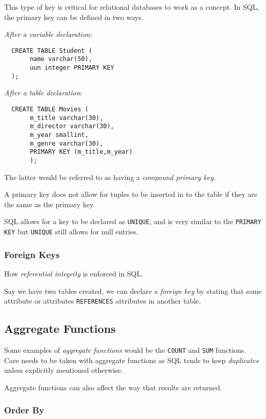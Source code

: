 \documentclass{article}
\begin{document}
This type of key is critical for relational databases to work as a concept. In SQL, the primary key can be defined in two ways.

\textit{After a variable declaration}:

\begin{lstlisting}
  CREATE TABLE Student (
       name varchar(50),
       uun integer PRIMARY KEY
  );
\end{lstlisting}

\textit{After a table declaration}:

\begin{lstlisting}
  CREATE TABLE Movies (
       m_title varchar(30),
       m_director varchar(30),
       m_year smallint,
       m_genre varchar(30),
       PRIMARY KEY (m_title,m_year)
       );
\end{lstlisting}

The latter would be referred to as having a \textit{compound primary key}.

A primary key does not allow for tuples to be inserted in to the table if they are the same as the primary key.

SQL allows for a key to be declared as \texttt{UNIQUE}, and is very similar to the \texttt{PRIMARY KEY} but \texttt{UNIQUE} still allows for null entries.

\subsubsection{Foreign Keys}

How \textit{referential integrity} is enforced in SQL.

Say we have two tables created, we can declare a \textit{foreign key} by stating that some attribute or attributes \texttt{REFERENCES} attributes in another table.

\filbreak
\subsection{Aggregate Functions}

Some examples of \textit{aggregate functions} would be the \texttt{COUNT} and \texttt{SUM} functions. Care needs to be taken with aggregate functions as SQL tends to keep \textit{duplicates} unless explicitly mentioned otherwise. 

Aggregate functions can also affect the way that results are returned.

\subsubsection{Order By}
\end{document}
